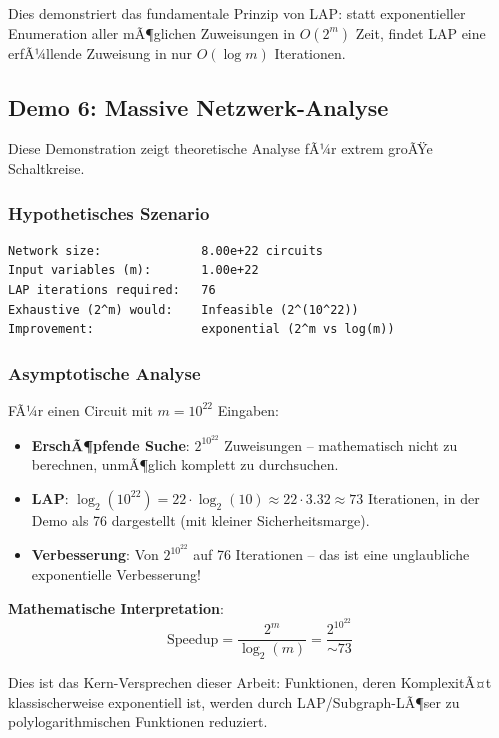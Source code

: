﻿\documentclass[a4paper,12pt]{article}
\theoremstyle{definition}
\begin{document}
Dies demonstriert das fundamentale Prinzip von LAP: statt exponentieller Enumeration aller mÃ¶glichen Zuweisungen in $O(2^m)$ Zeit, findet LAP eine erfÃ¼llende Zuweisung in nur $O(\log m)$ Iterationen.

\subsection{Demo 6: Massive Netzwerk-Analyse}

Diese Demonstration zeigt theoretische Analyse fÃ¼r extrem groÃŸe Schaltkreise.

\subsubsection{Hypothetisches Szenario}

\begin{lstlisting}
Network size:              8.00e+22 circuits
Input variables (m):       1.00e+22
LAP iterations required:   76
Exhaustive (2^m) would:    Infeasible (2^(10^22))
Improvement:               exponential (2^m vs log(m))
\end{lstlisting}

\subsubsection{Asymptotische Analyse}

FÃ¼r einen Circuit mit $m = 10^{22}$ Eingaben:

\begin{itemize}
    \item \textbf{ErschÃ¶pfende Suche}: $2^{10^{22}}$ Zuweisungen -- mathematisch nicht zu berechnen, unmÃ¶glich komplett zu durchsuchen.
    
    \item \textbf{LAP}: $\log_2(10^{22}) = 22 \cdot \log_2(10) \approx 22 \cdot 3.32 \approx 73$ Iterationen, in der Demo als 76 dargestellt (mit kleiner Sicherheitsmarge).
    
    \item \textbf{Verbesserung}: Von $2^{10^{22}}$ auf 76 Iterationen -- das ist eine unglaubliche exponentielle Verbesserung!
\end{itemize}

\textbf{Mathematische Interpretation}:
\[
\text{Speedup} = \frac{2^m}{\log_2(m)} = \frac{2^{10^{22}}}{\sim 73}
\]

Dies ist das Kern-Versprechen dieser Arbeit: Funktionen, deren KomplexitÃ¤t klassischerweise exponentiell ist, werden durch LAP/Subgraph-LÃ¶ser zu polylogarithmischen Funktionen reduziert.
\end{document}

